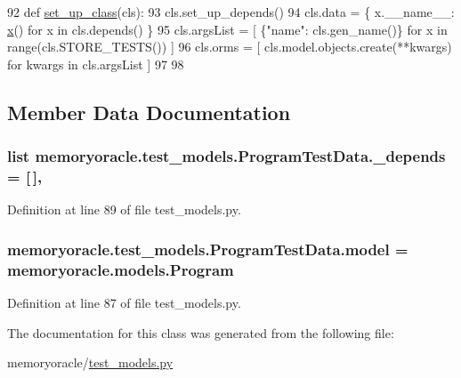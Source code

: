 \begin{DoxyCode}
92     \textcolor{keyword}{def }\hyperlink{classmemoryoracle_1_1test__models_1_1ProgramTestData_a341a2e2ab6c252fd01a332f26ad2b184}{set\_up\_class}(cls):
93         cls.set\_up\_depends()
94         cls.data = \{ x.\_\_name\_\_: \hyperlink{namespacememoryoracle_1_1instance_afe036cc8dc71469743d090c4c80d50c5}{x}() \textcolor{keywordflow}{for} x \textcolor{keywordflow}{in} cls.depends() \}
95         cls.argsList = [ \{\textcolor{stringliteral}{"name"}: cls.gen\_name()\} \textcolor{keywordflow}{for} x \textcolor{keywordflow}{in} range(cls.STORE\_TESTS()) ]
96         cls.orms = [ cls.model.objects.create(**kwargs) \textcolor{keywordflow}{for} kwargs \textcolor{keywordflow}{in} cls.argsList ]
97 
98 
\end{DoxyCode}


\subsection{Member Data Documentation}
\hypertarget{classmemoryoracle_1_1test__models_1_1ProgramTestData_ae1e42368f016a63e147d12152137e46e}{}
\subsubsection[{\+\_\+depends}]{\setlength{\rightskip}{0pt plus 5cm}list memoryoracle.\+test\+\_\+models.\+Program\+Test\+Data.\+\_\+depends = \mbox{[}$\,$\mbox{]}\hspace{0.3cm}{\ttfamily [static]}, {\ttfamily [private]}}\label{classmemoryoracle_1_1test__models_1_1ProgramTestData_ae1e42368f016a63e147d12152137e46e}


Definition at line 89 of file test\+\_\+models.\+py.

\hypertarget{classmemoryoracle_1_1test__models_1_1ProgramTestData_a89de08eb5e2a4a2662a7d8d2fc5d7ec4}{}
\subsubsection[{model}]{\setlength{\rightskip}{0pt plus 5cm}memoryoracle.\+test\+\_\+models.\+Program\+Test\+Data.\+model = {\bf memoryoracle.\+models.\+Program}\hspace{0.3cm}{\ttfamily [static]}}\label{classmemoryoracle_1_1test__models_1_1ProgramTestData_a89de08eb5e2a4a2662a7d8d2fc5d7ec4}


Definition at line 87 of file test\+\_\+models.\+py.



The documentation for this class was generated from the following file\+:\begin{DoxyCompactItemize}
\item 
memoryoracle/\hyperlink{test__models_8py}{test\+\_\+models.\+py}\end{DoxyCompactItemize}

